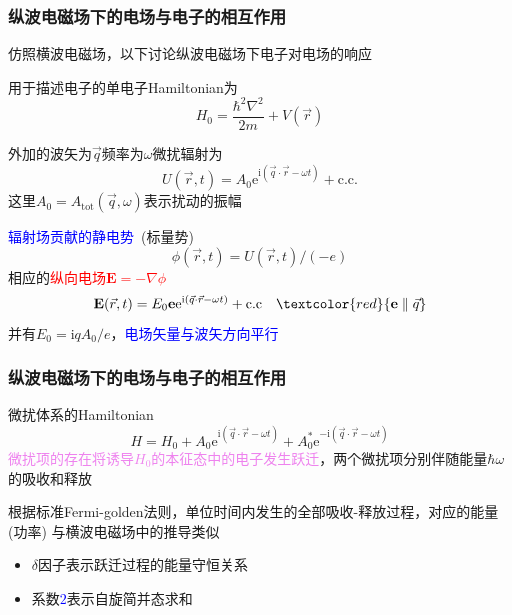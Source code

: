 {\frame
{
	\frametitle{纵波电磁场下的电场与电子的相互作用}
仿照横波电磁场，以下讨论纵波电磁场下电子对电场的响应

用于描述电子的单电子\textrm{Hamiltonian}为
\begin{displaymath}
	H_0=\frac{\hbar^2{\nabla}^2}{2m}+V(\vec r)
\end{displaymath}

外加的波矢为$\vec q$频率为$\omega$微扰辐射为
\begin{displaymath}
	U(\vec r,t)=A_0\mathrm{e}^{\mathrm{i}(\vec q\cdot\vec r-\omega t)}+\mathrm{c.c.}
\end{displaymath}
这里$A_0=A_{\mathrm{tot}}(\vec q,\omega)$表示扰动的振幅

\textcolor{blue}{辐射场贡献的静电势}~(标量势)
\begin{displaymath}
	\phi(\vec r,t)=U(\vec r,t)/(-e)
\end{displaymath}
相应的\textcolor{red}{纵向电场$\mathbf{E}=-\nabla\phi$}
\begin{displaymath}
	\mathbf{E}(\vec r,t)=E_0\mathbf{e}\mathrm{e}^{\mathrm{i}(\vec q\cdot\vec r-\omega t)}+\mathrm{c.c}\quad\textcolor{red}{\mathbf{e}\parallel\vec q}
\end{displaymath}
并有$E_0=\mathrm{i}qA_0/e$，\textcolor{blue}{电场矢量与波矢方向平行}
}

\frame
{
	\frametitle{纵波电磁场下的电场与电子的相互作用}
微扰体系的\textrm{Hamiltonian}
\begin{displaymath}
	H=H_0+A_0\mathrm{e}^{\mathrm{i}(\vec q\cdot\vec r-\omega t)}+A_0^{\ast}\mathrm{e}^{-\mathrm{i}(\vec q\cdot\vec r-\omega t)}
\end{displaymath}
\textcolor{violet}{微扰项的存在将诱导$H_0$的本征态中的电子发生跃迁}，两个微扰项分别伴随能量$\hbar\omega$的吸收和释放

根据标准\textrm{Fermi-golden}法则，单位时间内发生的全部吸收-释放过程，对应的能量(功率)
{\fontsize{9.0pt}{6.2pt}}
与横波电磁场中的推导类似
\begin{itemize}
	\item $\delta$因子表示跃迁过程的能量守恒关系
	\item 系数\textcolor{blue}{$2$}表示自旋简并态求和
\end{itemize}
}

}
